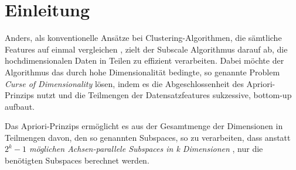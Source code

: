 \section{Einleitung}

Anders, als konventionelle Ansätze bei Clustering-Algorithmen, die sämtliche Features auf einmal
vergleichen \cite{Kaur.2014}, zielt der Subscale Algorithmus darauf ab, die hochdimensionalen Daten in Teilen
zu effizient verarbeiten.
Dabei möchte der Algorithmus das durch hohe Dimensionalität bedingte, so genannte Problem \emph{Curse
of Dimensionality} lösen, indem es die Abgeschlossenheit des Apriori-Prinzips
\cite{TechnicalReviewonBuprenorphine:anAlternativeTreatmentforOpioidDependence.1992} nutzt und die
Teilmengen der
Datensatzfeatures sukzessive, bottom-up aufbaut.

Das Apriori-Prinzips ermöglicht es aus der Gesamtmenge der Dimensionen in Teilmengen davon, den
so genannten Subspaces, so zu verarbeiten, dass anstatt \emph{$2^{k}-1$ möglichen Achsen-parallele
Subspaces in \emph{k} Dimensionen} \cite{Kaur.2014}, nur die benötigten Subspaces berechnet werden.
